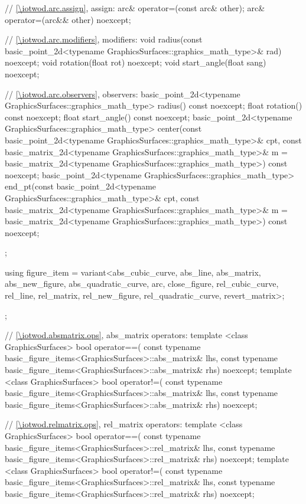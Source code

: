 \begin{codeblock}
{{{      // \ref{\iotwod.arc.assign}, assign:
      arc& operator=(const arc& other);
      arc& operator=(arc&& other) noexcept;

      // \ref{\iotwod.arc.modifiers}, modifiers:
      void radius(const basic_point_2d<typename GraphicsSurfaces::graphics_math_type>& rad) noexcept;
      void rotation(float rot) noexcept;
      void start_angle(float sang) noexcept;

      // \ref{\iotwod.arc.observers}, observers:
      basic_point_2d<typename GraphicsSurfaces::graphics_math_type> radius() const noexcept;
      float rotation() const noexcept;
      float start_angle() const noexcept;
      basic_point_2d<typename GraphicsSurfaces::graphics_math_type> center(const basic_point_2d<typename
        GraphicsSurfaces::graphics_math_type>& cpt, const basic_matrix_2d<typename
        GraphicsSurfaces::graphics_math_type>& m = basic_matrix_2d<typename
        GraphicsSurfaces::graphics_math_type>{}) const noexcept;
      basic_point_2d<typename GraphicsSurfaces::graphics_math_type> end_pt(const basic_point_2d<typename
        GraphicsSurfaces::graphics_math_type>& cpt, const basic_matrix_2d<typename
        GraphicsSurfaces::graphics_math_type>& m = basic_matrix_2d<typename
        GraphicsSurfaces::graphics_math_type>{}) const noexcept;
    };

    using figure_item = variant<abs_cubic_curve, abs_line, abs_matrix, abs_new_figure,
      abs_quadratic_curve, arc, close_figure, rel_cubic_curve, rel_line, rel_matrix,
      rel_new_figure, rel_quadratic_curve, revert_matrix>;
  };

  // \ref{\iotwod.absmatrix.ops}, abs_matrix operators:
  template <class GraphicsSurfaces>
  bool operator==(
    const typename basic_figure_items<GraphicsSurfaces>::abs_matrix& lhs,
    const typename basic_figure_items<GraphicsSurfaces>::abs_matrix& rhs) 
    noexcept;
  template <class GraphicsSurfaces>
  bool operator!=(
    const typename basic_figure_items<GraphicsSurfaces>::abs_matrix& lhs,
    const typename basic_figure_items<GraphicsSurfaces>::abs_matrix& rhs) 
    noexcept;

  // \ref{\iotwod.relmatrix.ops}, rel_matrix operators:
  template <class GraphicsSurfaces>
  bool operator==(
    const typename basic_figure_items<GraphicsSurfaces>::rel_matrix& lhs,
    const typename basic_figure_items<GraphicsSurfaces>::rel_matrix& rhs) 
    noexcept;
  template <class GraphicsSurfaces>
  bool operator!=(
    const typename basic_figure_items<GraphicsSurfaces>::rel_matrix& lhs,
    const typename basic_figure_items<GraphicsSurfaces>::rel_matrix& rhs) 
    noexcept;

}
\end{codeblock}
